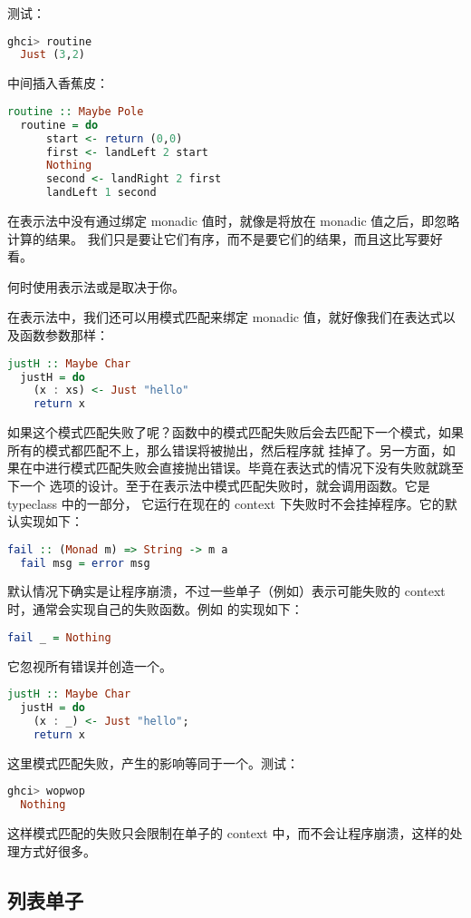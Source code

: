 \documentclass[./main.tex]{subfiles}
\begin{document}
测试：

\begin{lstlisting}[language=Haskell]
  ghci> routine
  Just (3,2)
\end{lstlisting}

中间插入香蕉皮：

\begin{lstlisting}[language=Haskell]
  routine :: Maybe Pole
  routine = do
      start <- return (0,0)
      first <- landLeft 2 start
      Nothing
      second <- landRight 2 first
      landLeft 1 second
\end{lstlisting}

在表示法中没有通过\acode{<-}绑定 monadic 值时，就像是将\acode{>>}放在 monadic 值之后，即忽略计算的结果。
我们只是要让它们有序，而不是要它们的结果，而且这比写要好看。

何时使用表示法或是\acode{>>=}取决于你。

在表示法中，我们还可以用模式匹配来绑定 monadic 值，就好像我们在表达式以及函数参数那样：

\begin{lstlisting}[language=Haskell]
  justH :: Maybe Char
  justH = do
    (x : xs) <- Just "hello"
    return x
\end{lstlisting}

如果这个模式匹配失败了呢？函数中的模式匹配失败后会去匹配下一个模式，如果所有的模式都匹配不上，那么错误将被抛出，然后程序就
挂掉了。另一方面，如果在中进行模式匹配失败会直接抛出错误。毕竟在表达式的情况下没有失败就跳至下一个
选项的设计。至于在表示法中模式匹配失败时，就会调用函数。它是 typeclass 中的一部分，
它运行在现在的 context 下失败时不会挂掉程序。它的默认实现如下：

\begin{lstlisting}[language=Haskell]
  fail :: (Monad m) => String -> m a
  fail msg = error msg
\end{lstlisting}

默认情况下确实是让程序崩溃，不过一些单子（例如）表示可能失败的 context 时，通常会实现自己的失败函数。例如
的实现如下：

\begin{lstlisting}[language=Haskell]
  fail _ = Nothing
\end{lstlisting}

它忽视所有错误并创造一个。

\begin{lstlisting}[language=Haskell]
  justH :: Maybe Char
  justH = do
    (x : _) <- Just "hello";
    return x
\end{lstlisting}

这里模式匹配失败，产生的影响等同于一个。测试：

\begin{lstlisting}[language=Haskell]
  ghci> wopwop
  Nothing
\end{lstlisting}

这样模式匹配的失败只会限制在单子的 context 中，而不会让程序崩溃，这样的处理方式好很多。

\subsection*{列表单子}



\end{document}
